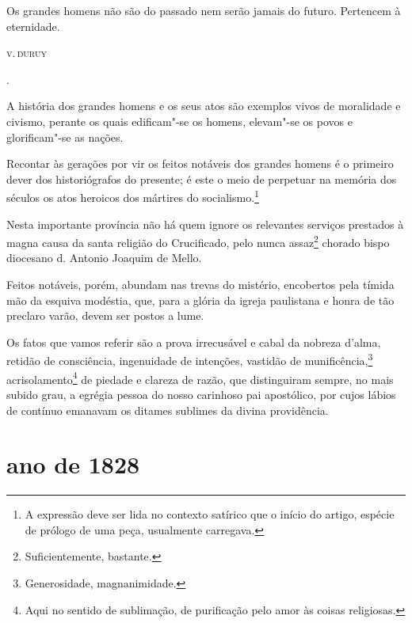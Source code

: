\epigraph{Os grandes homens não são do passado
nem serão jamais do futuro. Pertencem à eternidade.}{\textsc{v.\,duruy}\footnotemark}.

A história dos grandes homens e os seus atos são exemplos vivos de
moralidade e civismo, perante os quais edificam"-se os homens, elevam"-se
os povos e glorificam"-se as nações.

Recontar às gerações por vir os feitos notáveis dos grandes homens é o
primeiro dever dos historiógrafos do presente; é este o meio de
perpetuar na memória dos séculos os atos heroicos dos mártires do
socialismo.\footnote{A expressão deve ser lida no contexto satírico
  que o início do artigo, espécie de prólogo de uma peça, usualmente
  carregava.}

Nesta importante província não há quem ignore os relevantes serviços
prestados à magna causa da santa religião do Crucificado, pelo nunca
assaz\footnote{Suficientemente, bastante.} chorado bispo diocesano d.
Antonio Joaquim de Mello.

Feitos notáveis, porém, abundam nas trevas do mistério, encobertos pela
tímida mão da esquiva modéstia, que, para a glória da igreja paulistana
e honra de tão preclaro varão, devem ser postos a lume.

Os fatos que vamos referir são a prova irrecusável e cabal da nobreza
d'alma, retidão de consciência, ingenuidade de intenções, vastidão de
munificência,\footnote{Generosidade, magnanimidade.}
acrisolamento\footnote{Aqui no sentido de sublimação, de purificação
  pelo amor às coisas religiosas.} de piedade e clareza de razão, que
distinguiram sempre, no mais subido grau, a egrégia pessoa do nosso
carinhoso pai apostólico, por cujos lábios de contínuo emanavam os
ditames sublimes da divina providência.

\section*{ano de 1828}

